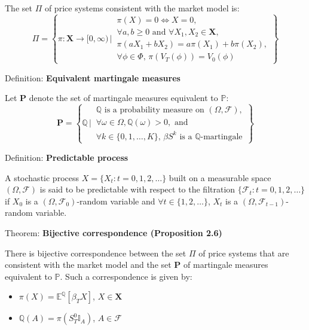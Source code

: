 \documentclass[12pt,a4paper]{article}
\begin{document}
The set $\Pi$ of price systems consistent with the market model is:
\[
\Pi = \left\{ \pi : \mathbf{X} \to [0, \infty) \,\bigg|\, \begin{array}{l} \pi(X) = 0 \Leftrightarrow X = 0, \\[0.3em] \forall a, b \geq 0 \text{ and } \forall X_1, X_2 \in \mathbf{X}, \\[0.3em] \pi(aX_1 + bX_2) = a\pi(X_1) + b\pi(X_2), \\[0.3em] \forall \phi \in \Phi, \, \pi(V_T(\phi)) = V_0(\phi) \end{array} \right\}
\]
\vspace{1em}

Definition: \textbf{Equivalent martingale measures}
\vspace{0.5em}

Let $\mathbf{P}$ denote the set of martingale measures equivalent to $\mathbb{P}$:
\[
\mathbf{P} = \left\{ \mathbb{Q} \,\bigg|\, \begin{array}{l} \mathbb{Q} \text{ is a probability measure on } (\Omega, \mathcal{F}), \\[0.3em] \forall \omega \in \Omega, \mathbb{Q}(\omega) > 0, \text{ and} \\[0.3em] \forall k \in \{0, 1, \ldots, K\}, \, \beta S^k \text{ is a } \mathbb{Q}\text{-martingale} \end{array} \right\}
\]
\vspace{1em}

Definition: \textbf{Predictable process}
\vspace{0.5em}

A stochastic process $X = \{X_t : t = 0, 1, 2, \ldots\}$ built on a measurable space $(\Omega, \mathcal{F})$ is said to be predictable with respect to the filtration $\{\mathcal{F}_t : t = 0, 1, 2, \ldots\}$ if $X_0$ is a $(\Omega, \mathcal{F}_0)$-random variable and $\forall t \in \{1, 2, \ldots\}$, $X_t$ is a $(\Omega, \mathcal{F}_{t-1})$-random variable.
\vspace{1em}

Theorem: \textbf{Bijective correspondence (Proposition 2.6)}
\vspace{0.5em}

There is bijective correspondence between the set $\Pi$ of price systems that are consistent with the market model and the set $\mathbf{P}$ of martingale measures equivalent to $\mathbb{P}$. Such a correspondence is given by:
\begin{itemize}
	\item[(i)] $\pi(X) = \mathbb{E}^{\mathbb{Q}}[\beta_T X]$, $X \in \mathbf{X}$
	\item[(ii)] $\mathbb{Q}(A) = \pi(S_T^0 \mathbb{I}_A)$, $A \in \mathcal{F}$
\end{itemize}
\end{document}
